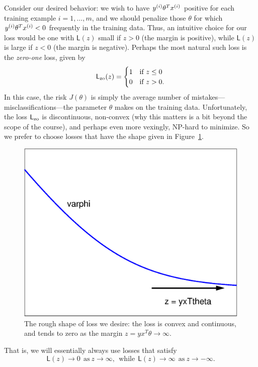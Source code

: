 \documentclass{article}
\newcommand{\loss}{\mathsf{L}}
\begin{document}
Consider our desired behavior: we wish to have ${y^{(i)}} \theta^T {x^{(i)}}$ positive
for each training example $i = 1, \ldots, m$, and we should penalize those
$\theta$ for which ${y^{(i)}} \theta^T {x^{(i)}} < 0$ frequently in the training
data. Thus, an intuitive choice for our loss would be one with $\loss(z)$
small if $z > 0$ (the margin is positive), while $\loss(z)$ is large if $z
< 0$ (the margin is negative).
Perhaps the most natural such loss is the \emph{zero-one} loss,
given by
\begin{equation*}
  \zoloss(z) = \begin{cases} 1 & \mbox{if~} z \le 0 \\
    0 & \mbox{if}~ z > 0.
  \end{cases}
\end{equation*}
In this case, the risk $J(\theta)$ is simply the average number of
mistakes---misclassifications---the parameter $\theta$ makes on the training
data. Unfortunately, the loss $\zoloss$ is discontinuous, non-convex (why
this matters is a bit beyond the scope of the course), and perhaps even more
vexingly, NP-hard to minimize. So we prefer to choose losses that have the
shape given in Figure~\ref{fig:simple-loss-shape}.
\begin{figure}[h!]
  \begin{center}
    \psfrag{varphi}{$\loss$}
    \includegraphics[width=.6\columnwidth]{logistic-loss.eps}
    \caption{\label{fig:simple-loss-shape} The rough shape
      of loss we desire: the loss is convex and continuous,
      and tends to zero as the margin $z = y x^T \theta \to \infty$.}
  \end{center}
\end{figure}
That is, we will essentially always use losses that satisfy
\begin{equation*}
  \loss(z) \to 0
  ~~ \mbox{as}~ z \to \infty,
  ~~ \mbox{while} ~~
  \loss(z) \to \infty
  ~~ \mbox{as} ~ z \to -\infty.
\end{equation*}
\end{document}
